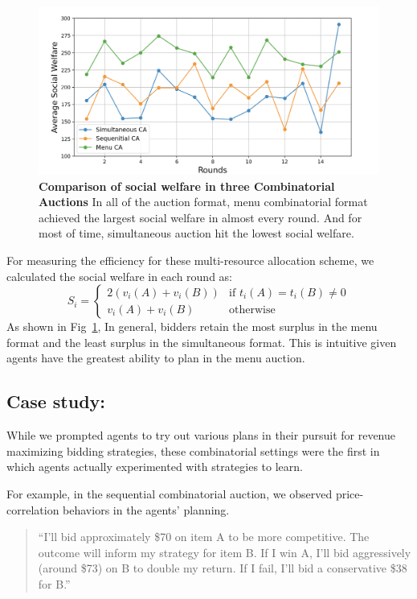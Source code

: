 \documentclass{article} %
\begin{document}
\begin{figure}[h]
    \centering \includegraphics[width=0.9\linewidth]{Figs/social_welfare.png}
    \caption{\textbf{Comparison of social welfare in three Combinatorial Auctions} In all of the auction format, menu combinatorial format achieved the largest social welfare in almost every round. 
    And for most of time, simultaneous auction hit the lowest social welfare.}
    \label{fig:social}
\end{figure}

For measuring the efficiency for these multi-resource allocation scheme, we calculated the social welfare in each round as:
\begin{equation}
   S_i = 
   \begin{cases}
      2 \left( v_i(A) + v_i(B) \right) & \text{if } t_i(A) = t_i(B) \neq 0\\
      v_i(A) + v_i(B) & \text{otherwise}
   \end{cases}
\end{equation}
As shown in Fig~\ref{fig:social}, In general, bidders retain the most surplus in the menu format and the least surplus in the simultaneous format. 
This is intuitive given agents have the greatest ability to plan in the menu auction.


\subsection{Case study:}
While we prompted agents to try out various plans in their pursuit for revenue maximizing bidding strategies, these combinatorial settings were the first in which agents actually experimented with strategies to learn. 

For example, in the sequential combinatorial auction, we observed price-correlation behaviors in the agents' planning.
\begin{quote}
    ``I'll bid approximately \$70 on item A to be more competitive. The outcome will inform my strategy for item B. If I win A, I'll bid aggressively (around \$73) on B to double my return. If I fail, I'll bid a conservative \$38 for B.''
\end{quote}
\end{document}
